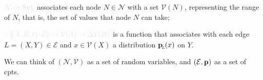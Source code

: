 \documentclass{article}
\newcommand{\notation}[2][]{#1}
\renewcommand{\notation}[2][]{{\color{notationcolor} #2}}
\newcommand{\bp}[1][L]{\mat{p}_{\!_#1\!}}
\newcommand{\V}{\mathcal V}
\newcommand{\N}{\mathcal N}
\newcommand{\Ed}{\mathcal E}
\newcommand{\MN}{PDG}
\numberwithin{equation}{section}
\begin{document}
\begin{defn}[\MN]
\begin{description}[nosep]
			\item[$\V$] $\notation{\N \to \mathbf{Set}}$
                          associates each node $N \in \N$ with a set
                          $\V(N)$, 
			  representing the range of $N$, that is, the
                          set of values that node $N$ can take; 
			\item[$\mat p$] $\notation{\colon \big(\!({A,B,\ell})\colon \! \Ed \big) \to \V(A) \to \Delta\V(B)}$
is a function that  associates with each edge $L = (X,Y)
                          \in 
                          \Ed$ and $x \in \V(X)$ a distribution $\bp(x)$ on $Y$. 
		\end{description}
	\end{defn}
	\begin{remark}
		We can think of $(\N, \V)$ as a set of random variables, and $(\Ed,\mat p)$ as a set of cpts.
	\end{remark}
\end{document}
